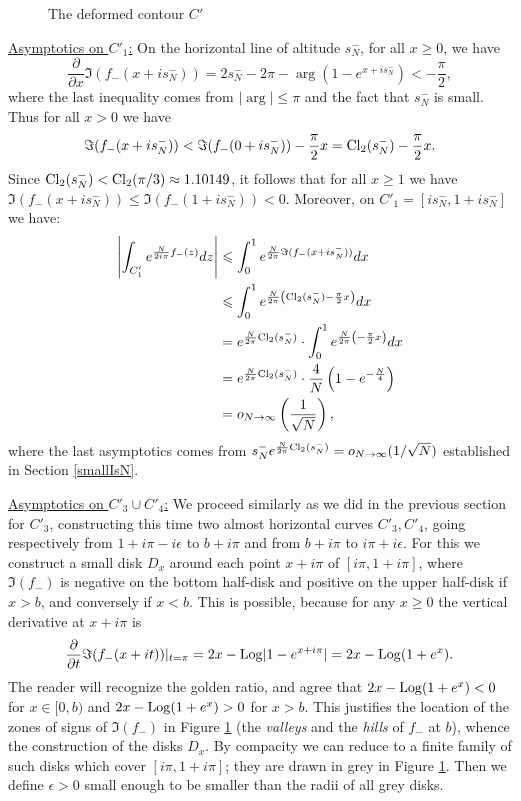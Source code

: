 \documentclass[11pt]{amsart}
\newcommand{\Log}{{\rm Log}}
\begin{document}
{\begin{figure}[!h]
\begin{tikzpicture}
	\end{tikzpicture}
	\caption{The deformed contour $C'$}\label{fig:contourC':b:+}	
\end{figure}
\smallskip

\underline{Asymptotics on $C'_1$:} On the horizontal line of altitude $s_N^-$, for all $x\geqslant 0$, we have
$$\dfrac{\partial}{\partial x} \Im (f_-(x+is_N^-)) = 2s_N^--2\pi - \arg\left (1-e^{x+is_N^-}\right )<-\frac{\pi}{2},$$
where the last inequality comes from $|\arg|\leqslant \pi$ and the fact that $s_N^-$ is small. Thus for all  $x> 0$ we have
$$\Im (f_-(x+is_N^-)) < \Im (f_-(0+is_N^-))- \frac{\pi}{2}x = {\rm Cl}_2(s_N^-)-\frac{\pi}{2}x.$$
Since ${\rm Cl}_2(s_N^-)< {\rm Cl}_2(\pi/3) \approx 1.10149$, it follows that for all $x \geqslant 1$ we have $\Im (f_-(x+is_N^-))\leqslant 
\Im (f_-(1+is_N^-))< 0$. Moreover, on $C'_1=[is_N^-,1+is_N^-]$ we have:
\begin{align*}
 \left |\int_{C'_1} e^{\frac{N}{2 i \pi}f_-(z)}dz\right | 
 &\leqslant
\int_0^{1}e^{\frac{N}{2  \pi}\Im (f_-(x+is_N^-))}dx\\
&\leqslant  \int_0^{1}e^{\frac{N}{2  \pi}\left ({\rm Cl}_2(s_N^-)-\frac{\pi}{2}x\right )}dx\\
&= e^{\frac{N}{2  \pi}{\rm Cl}_2(s_N^-)} \cdot  \int_0^{1}e^{\frac{N}{2 
		 \pi}\left (-\frac{\pi}{2}x\right )}dx \\
	 &= e^{\frac{N}{2  \pi}{\rm Cl}_2(s_N^-)} \cdot 
	 \dfrac{4}{N}\left (1-e^{-\frac{N}{4}}\right )\\
&=o_{N\to \infty}\left (\frac{1}{\sqrt{N}}\right ),\end{align*}
where the last asymptotics comes from $s_N^- e^{\frac{N}{2\pi}{\rm Cl}_2(s_N^-)}=
o_{N\to \infty}(1/\sqrt{N})$ established in Section \ref{smallIsN}.
\smallskip

\underline{Asymptotics on $C'_3 \cup C'_4$:} We proceed similarly as we did in the previous section for $C'_3$, constructing this time two almost horizontal curves $C'_3, C'_4$, going respectively from $1+i\pi-i\epsilon$ to $b+i\pi$ and from $b+i\pi$ to $i\pi+i\epsilon$. For this we construct a small disk $D_x$ around each point $x+i\pi$ of $[i\pi,1+i\pi]$, where $\Im(f_-)$ is negative on the bottom half-disk and
positive on the upper half-disk if $x>b$, and conversely if $x<b$. This is possible, because for any $x\geqslant0$ the vertical derivative at $x+i\pi$ is
$$\dfrac{\partial}{\partial t} \Im (f_-(x+it)) \vert_{t=\pi}
= 2x - \Log \vert 1-e^{x+i\pi} \vert=2x-\Log(1+e^x).$$
The reader will recognize the golden ratio, and agree that $2x-\Log(1+e^x)<0$ for $x \in [0,b)$ and $2x-\Log(1+e^x)>0$ for $x>b$. This justifies the location of the zones of signs of $\Im(f_-)$ in Figure \ref{fig:contourC':b:+} (the {\it valleys} and the {\it hills} of $f_-$ at $b$), whence the construction of the disks $D_x$. By compacity we can reduce to a finite family of such disks which cover $[i\pi,1+i\pi]$; they are drawn in grey in Figure \ref{fig:contourC':b:+}. Then we define $\epsilon>0$ small enough to be smaller than the radii of all grey disks.

}
\end{document}
